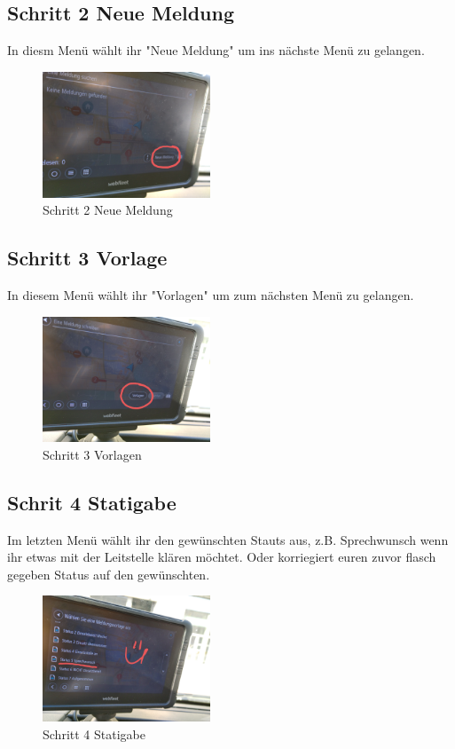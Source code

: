 \documentclass[a4paper,12pt]{scrartcl}
\begin{document}
    \subsection{Schritt 2 Neue Meldung}
    In diesm Menü wählt ihr "Neue Meldung" um ins nächste Menü zu gelangen.
    \begin{figure}[h]
        \begin{center}
            \includegraphics[width=5cm]{bilder/Schritt2.jpg}
            \caption{Schritt 2 Neue Meldung}
            \label{Neue Meldung}
        \end{center} 
    \end{figure}

    \newpage
    \subsection{Schritt 3 Vorlage}
    In diesem Menü wählt ihr "Vorlagen" um zum nächsten Menü zu gelangen.
    \begin{figure}[h]
        \begin{center}
            \includegraphics[width=5cm]{bilder/Schritt3.jpg}
            \caption{Schritt 3 Vorlagen}
            \label{Vorlagen}
        \end{center} 
    \end{figure}

    \subsection{Schrit 4 Statigabe}
    Im letzten Menü wählt ihr den gewünschten Stauts aus, z.B. Sprechwunsch wenn ihr etwas mit der Leitstelle
    klären möchtet. Oder korriegiert euren zuvor flasch gegeben Status auf den gewünschten.
    \begin{figure}[h]
        \begin{center}
            \includegraphics[width=5cm]{bilder/Schritt4.jpg}
            \caption{Schritt 4 Statigabe}
            \label{Statigabe}
        \end{center} 
    \end{figure}
\end{document}
